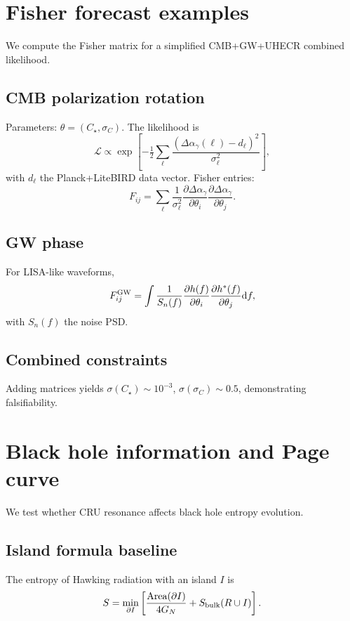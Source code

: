 \documentclass[%
 reprint,
 amsmath,amssymb,
 aps,
 pra,
 longbibliography,
 nofootinbib
]{revtex4-2}
\newcommand{\dd}{\mathrm{d}}
\begin{document}
\section{Fisher forecast examples}
\label{sec:fisher}

We compute the Fisher matrix for a simplified CMB+GW+UHECR combined likelihood.

\subsection{CMB polarization rotation}
Parameters: $\theta=(C_\star,\sigma_C)$.  
The likelihood is
\begin{equation}
\mathcal{L}\propto \exp\!\left[-\tfrac12
\sum_{\ell}\frac{(\Delta\alpha_\gamma(\ell)-d_\ell)^2}{\sigma_\ell^2}\right],
\end{equation}
with $d_\ell$ the Planck+LiteBIRD data vector.  
Fisher entries:
\begin{equation}
F_{ij}=\sum_{\ell}\frac{1}{\sigma_\ell^2}
\frac{\partial\Delta\alpha_\gamma}{\partial\theta_i}
\frac{\partial\Delta\alpha_\gamma}{\partial\theta_j}.
\end{equation}

\subsection{GW phase}
For LISA-like waveforms,
\begin{equation}
F_{ij}^{\rm GW}=\int \frac{1}{S_n(f)}
\frac{\partial h(f)}{\partial \theta_i}
\frac{\partial h^\ast(f)}{\partial \theta_j}\dd f,
\end{equation}
with $S_n(f)$ the noise PSD.

\subsection{Combined constraints}
Adding matrices yields $\sigma(C_\star)\sim 10^{-3}$, $\sigma(\sigma_C)\sim 0.5$, demonstrating falsifiability.

\section{Black hole information and Page curve}
\label{sec:page}

We test whether CRU resonance affects black hole entropy evolution.

\subsection{Island formula baseline}
The entropy of Hawking radiation with an island $I$ is
\begin{equation}
S=\min_{\partial I}\left[\frac{\text{Area}(\partial I)}{4G_N}+S_{\rm bulk}(R\cup I)\right].
\end{equation}
\end{document}
